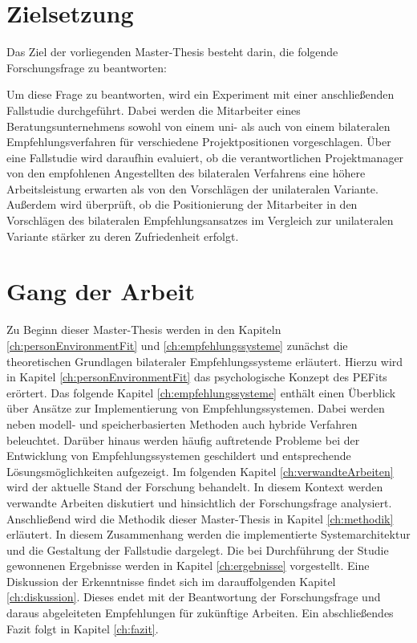 \newpage
\section{Zielsetzung}
\label{sec:intro:zielsetzung}
Das Ziel der vorliegenden Master-Thesis besteht darin, die folgende Forschungsfrage zu beantworten:

\forschungsfrage

Um diese Frage zu beantworten, wird ein Experiment mit einer anschließenden Fallstudie durchgeführt. Dabei werden die Mitarbeiter eines Beratungsunternehmens sowohl von einem uni- als auch von einem bilateralen Empfehlungsverfahren für verschiedene Projektpositionen vorgeschlagen. Über eine Fallstudie wird daraufhin evaluiert, ob die verantwortlichen Projektmanager von den empfohlenen Angestellten des bilateralen Verfahrens eine höhere Arbeitsleistung erwarten als von den Vorschlägen der unilateralen Variante. Außerdem wird überprüft, ob die Positionierung der Mitarbeiter in den Vorschlägen des bilateralen Empfehlungsansatzes im Vergleich zur unilateralen Variante stärker zu deren Zufriedenheit erfolgt.

\section{Gang der Arbeit}
\label{sec:intro:gangDerArbeit}
Zu Beginn dieser Master-Thesis werden in den Kapiteln \ref{ch:personEnvironmentFit} und \ref{ch:empfehlungssysteme} zunächst die theoretischen Grundlagen bilateraler Empfehlungssysteme erläutert. Hierzu wird in Kapitel \ref{ch:personEnvironmentFit} das psychologische Konzept des \acp{PEFit} erörtert. Das folgende Kapitel \ref{ch:empfehlungssysteme} enthält einen Überblick über Ansätze zur Implementierung von Empfehlungssystemen. Dabei werden neben modell- und speicherbasierten Methoden auch hybride Verfahren beleuchtet. Darüber hinaus werden häufig auftretende Probleme bei der Entwicklung von Empfehlungssystemen geschildert und entsprechende Lösungsmöglichkeiten aufgezeigt. Im folgenden Kapitel \ref{ch:verwandteArbeiten} wird der aktuelle Stand der Forschung behandelt. In diesem Kontext werden verwandte Arbeiten diskutiert und hinsichtlich der Forschungsfrage analysiert. Anschließend wird die Methodik dieser Master-Thesis in Kapitel \ref{ch:methodik} erläutert. In diesem Zusammenhang werden die implementierte Systemarchitektur und die Gestaltung der Fallstudie dargelegt. Die bei Durchführung der Studie gewonnenen Ergebnisse werden in Kapitel \ref{ch:ergebnisse} vorgestellt. Eine Diskussion der Erkenntnisse findet sich im darauffolgenden Kapitel \ref{ch:diskussion}. Dieses endet mit der Beantwortung der Forschungsfrage und daraus abgeleiteten Empfehlungen für zukünftige Arbeiten. Ein abschließendes Fazit folgt in Kapitel \ref{ch:fazit}.
